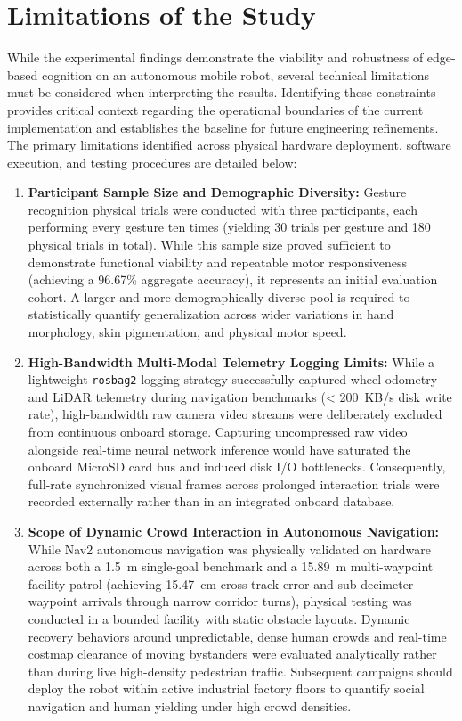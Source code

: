 \section{Limitations of the Study}
While the experimental findings demonstrate the viability and robustness of edge-based cognition on an autonomous mobile robot, several technical limitations must be considered when interpreting the results. Identifying these constraints provides critical context regarding the operational boundaries of the current implementation and establishes the baseline for future engineering refinements. The primary limitations identified across physical hardware deployment, software execution, and testing procedures are detailed below:

\begin{enumerate}
    \item \textbf{Participant Sample Size and Demographic Diversity:} Gesture recognition physical trials were conducted with three participants, each performing every gesture ten times (yielding 30 trials per gesture and 180 physical trials in total). While this sample size proved sufficient to demonstrate functional viability and repeatable motor responsiveness (achieving a 96.67\% aggregate accuracy), it represents an initial evaluation cohort. A larger and more demographically diverse pool is required to statistically quantify generalization across wider variations in hand morphology, skin pigmentation, and physical motor speed.
    \item \textbf{High-Bandwidth Multi-Modal Telemetry Logging Limits:} While a lightweight \texttt{rosbag2} logging strategy successfully captured wheel odometry and LiDAR telemetry during navigation benchmarks (< 200~KB/s disk write rate), high-bandwidth raw camera video streams were deliberately excluded from continuous onboard storage. Capturing uncompressed raw video alongside real-time neural network inference would have saturated the onboard MicroSD card bus and induced disk I/O bottlenecks. Consequently, full-rate synchronized visual frames across prolonged interaction trials were recorded externally rather than in an integrated onboard database.
    \item \textbf{Scope of Dynamic Crowd Interaction in Autonomous Navigation:} While Nav2 autonomous navigation was physically validated on hardware across both a 1.5~m single-goal benchmark and a 15.89~m multi-waypoint facility patrol (achieving 15.47~cm cross-track error and sub-decimeter waypoint arrivals through narrow corridor turns), physical testing was conducted in a bounded facility with static obstacle layouts. Dynamic recovery behaviors around unpredictable, dense human crowds and real-time costmap clearance of moving bystanders were evaluated analytically rather than during live high-density pedestrian traffic. Subsequent campaigns should deploy the robot within active industrial factory floors to quantify social navigation and human yielding under high crowd densities.

\end{enumerate}
